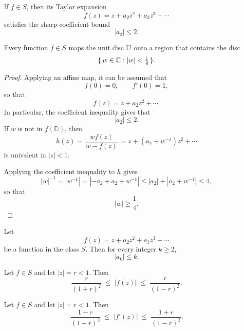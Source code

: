 \begin{theorem}
	If \(f \in S\), then its Taylor expansion
	\[
	f(z) = z + a_2 z^2 + a_3 z^3 + \cdots
	\]
	satisfies the sharp coefficient bound
	\begin{equation}\label{eq:bieberbach-a2}
		|a_2| \le 2.
	\end{equation}
\end{theorem}
\begin{theorem}
	Every function \(f \in S\) maps the unit disc \(\mathbb{U}\) onto a region that contains the disc
	\[
	\{\, w \in \mathbb{C} : |w| < \tfrac{1}{4} \,\}.
	\]
\end{theorem}

\begin{proof}
Applying an affine map, it can be assumed that
\[
f(0)=0,\qquad f'(0)=1,
\]
so that
\[
f(z)=z+a_{2}z^{2}+\cdots .
\]
In particular, the coefficient inequality gives that 
\[
|a_{2}| \le 2.
\]
If \(w\) is not in \(f(\mathbb{D})\), then
\[
h(z)=\frac{w f(z)}{\,w - f(z)\,}
= z + (a_{2}+w^{-1})z^{2} + \cdots
\]
is univalent in \(|z|<1\).

Applying the coefficient inequality to \(h\) gives
\[
|w|^{-1} = |w^{-1}| 
= |-a_{2} + a_{2} + w^{-1}|
\le |a_{2}| + |a_{2} + w^{-1}|
\le 4,
\]
so that
\[
|w|\ge \frac{1}{4}.
\]\end{proof}

\begin{theorem}
	Let
	\[
	f(z) = z + a_2 z^2 + a_3 z^3 + \cdots
	\]
	be a function in the class \(S\).  
	Then for every integer \(k \ge 2\),
	\begin{equation}\label{eq:bieberbach-ak}
		|a_k| \le k.
	\end{equation}
\end{theorem}

\begin{theorem}
	Let \(f \in S\) and let \(|z| = r < 1\). Then
	\begin{equation}\label{eq:growth}
		\frac{r}{(1+r)^2}
		\;\le\;
		|f(z)|
		\;\le\;
		\frac{r}{(1-r)^2}.
	\end{equation}
\end{theorem}

\begin{theorem}
	Let \(f \in S\) and let \(|z| = r < 1\). Then
	\begin{equation}\label{eq:distortion}
		\frac{1-r}{(1+r)^3}
		\;\le\;
		|f'(z)|
		\;\le\;
		\frac{1+r}{(1-r)^3}.
	\end{equation}
\end{theorem}

